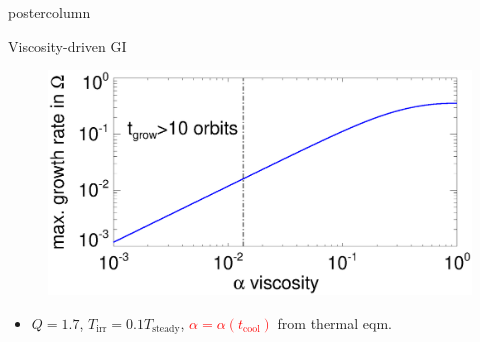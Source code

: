 \documentclass[final,hyperref={pdfpagelabels=false}]{beamer}
\begin{document}
\begin{frame}
\begin{columns}
\begin{column}{.49\textwidth}
\begin{beamercolorbox}[center,wd=\textwidth]{postercolumn}
\begin{minipage}[T]{.95\textwidth}
{            \begin{block}{{\Large Viscosity-driven GI}}
              \justifying
              \begin{figure}
                \includegraphics[width=\linewidth,clip=true,trim=0cm 0cm 0cm 1.1cm]{figures/result2d_gvisc}
              \end{figure}
              \vspace{-.8cm}
               \begin{itemize}
                \item $Q=1.7$, $T_\mathrm{irr}=0.1T_\mathrm{steady}$,
                  \textcolor{red}{$\alpha=\alpha(t_\mathrm{cool})$} from thermal eqm. 
                \end{itemize}
            \end{block}
              
}
\end{minipage}
\end{beamercolorbox}
\end{column}
\end{columns}
\end{frame}
\end{document}
